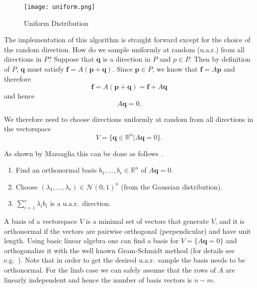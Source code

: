 
\begin{figure}[ht]
   \begin{center}
    \texttt{[image: uniform.png]}
      \caption{Uniform Distribution}
      \label{fig_hr5}
  \end{center}
\end{figure}


The implementation of this algorithm is straight forward except for the choice of the random direction. How do we sample uniformly at random (u.a.r.) from all directions in $P$? Suppose that $\textbf{q}$ is a direction in $P$ and $p \in P$. Then by definition of $P$, $\textbf{q}$ must satisfy $\textbf{f} = A(\textbf{p}+\textbf{q})$. Since $\textbf{p} \in P$, we know that $\textbf{f} = A\textbf{p}$ and therefore 
\[\textbf{f} = A(\textbf{p} + \textbf{q}) = \textbf{f} + A\textbf{q}\]
and hence
\[A\textbf{q} = 0.\]

We therefore need to choose directions uniformly at random from all directions in the vectorspace 
\[V = \{\textbf{q} \in \mathbb{R}^n | A\textbf{q} = 0\}.\]

As shown by Marsaglia this can be done as follows \cite{Marsaglia}.

\begin{enumerate}
\item
Find an orthonormal basis $b_1, \dots, b_r \in \mathbb{R}^{n}$ of $A\textbf{q} =0$.
\item
Choose $(\lambda_1, \dots, \lambda_r) \in \mathcal{N}(0,1)^n$ (from the Gaussian distribution).
\item
$\sum_{i=1}^r \lambda_i b_i$ is a u.a.r.\ direction.
\end{enumerate}

A basis of a vectorspace $V$ is a minimal set of vectors that generate $V$, and it is orthonormal if the vectors are pairwise orthogonal (perpendicular) and have unit length. Using basic linear algebra one can find a basis for $V = \{A\textbf{q} = 0\}$ and orthogonalize it with the well known Gram-Schmidt method (for details see e.g.\ \cite{Robertson}). Note that in order to get the desired u.a.r.\ sample the basis needs to be orthonormal. For the limb case we can safely assume that the rows of $A$ are linearly independent and hence the number of basis vectors is $n-m$.



